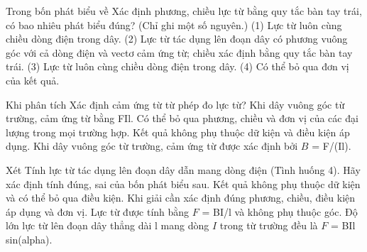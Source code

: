 \begin{ex}
Trong bốn phát biểu về Xác định phương, chiều lực từ bằng quy tắc bàn tay trái, có bao nhiêu phát biểu đúng? (Chỉ ghi một số nguyên.) (1) Lực từ luôn cùng chiều dòng điện trong dây. (2) Lực từ tác dụng lên đoạn dây có phương vuông góc với cả dòng điện và vectơ cảm ứng từ; chiều xác định bằng quy tắc bàn tay trái. (3) Lực từ luôn cùng chiều dòng điện trong dây. (4) Có thể bỏ qua đơn vị của kết quả.
\end{ex}

\begin{ex}
Khi phân tích Xác định cảm ứng từ từ phép đo lực từ?
\choice
{Khi dây vuông góc từ trường, cảm ứng từ bằng FIl.}
{Có thể bỏ qua phương, chiều và đơn vị của các đại lượng trong mọi trường hợp.}
{Kết quả không phụ thuộc dữ kiện và điều kiện áp dụng.}
{\True Khi dây vuông góc từ trường, cảm ứng từ được xác định bởi $B$ = F/(Il).}
\end{ex}

\begin{ex}
Xét Tính lực từ tác dụng lên đoạn dây dẫn mang dòng điện (Tình huống 4). Hãy xác định tính đúng, sai của bốn phát biểu sau.
\choiceTF
{Kết quả không phụ thuộc dữ kiện và có thể bỏ qua điều kiện.}
{\True Khi giải cần xác định đúng phương, chiều, điều kiện áp dụng và đơn vị.}
{Lực từ được tính bằng $F$ = BI/l và không phụ thuộc góc.}
{\True Độ lớn lực từ lên đoạn dây thẳng dài l mang dòng $I$ trong từ trường đều là $F$ = BIl sin(alpha).}
\end{ex}

